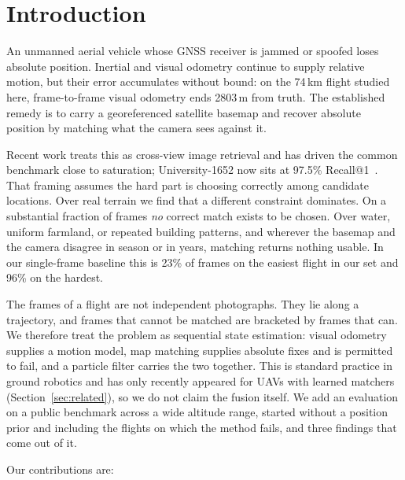 \documentclass[conference]{IEEEtran}
\begin{document}
\section{Introduction}

An unmanned aerial vehicle whose GNSS receiver is jammed or spoofed loses
absolute position. Inertial and visual odometry continue to supply relative
motion, but their error accumulates without bound: on the 74\,km flight
studied here, frame-to-frame visual odometry ends 2803\,m from truth. The
established remedy is to carry a georeferenced satellite basemap and recover
absolute position by matching what the camera sees against it.

Recent work treats this as cross-view image retrieval and has driven the
common benchmark close to saturation; University-1652 now sits at 97.5\%
Recall@1~\cite{mgs2net}. That framing assumes the hard part is choosing
correctly among candidate locations. Over real terrain we find that a
different constraint dominates. On a substantial fraction of frames \emph{no}
correct match exists to be chosen. Over water, uniform farmland, or
repeated building patterns, and wherever the basemap and the camera disagree
in season or in years, matching returns nothing usable. In our single-frame
baseline this is 23\% of frames on the easiest flight in our set and 96\% on
the hardest.

The frames of a flight are not independent photographs. They lie along a
trajectory, and frames that cannot be matched are bracketed by frames that
can. We therefore treat the problem as sequential state estimation: visual
odometry supplies a motion model, map matching supplies absolute fixes and is
permitted to fail, and a particle filter carries the two together. This is
standard practice in ground robotics and has only recently appeared for UAVs
with learned matchers (Section~\ref{sec:related}), so we do not claim the
fusion itself. We add an evaluation on a public benchmark across a wide
altitude range, started without a position prior and including the flights on
which the method fails, and three findings that come out of it.

Our contributions are:
\end{document}
